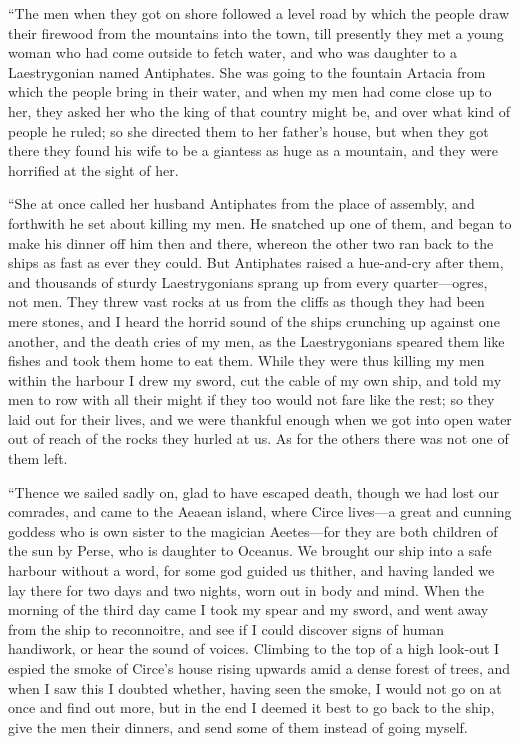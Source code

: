 “The men when they got on shore followed a level road by which the people draw
their firewood from the mountains into the town, till presently they met a
young woman who had come outside to fetch water, and who was daughter to a
Laestrygonian named Antiphates. She was going to the fountain Artacia from
which the people bring in their water, and when my men had come close up to
her, they asked her who the king of that country might be, and over what kind
of people he ruled; so she directed them to her father’s house, but when they
got there they found his wife to be a giantess as huge as a mountain, and they
were horrified at the sight of her.

“She at once called her husband Antiphates from the place of assembly, and
forthwith he set about killing my men. He snatched up one of them, and began to
make his dinner off him then and there, whereon the other two ran back to the
ships as fast as ever they could. But Antiphates raised a hue-and-cry after
them, and thousands of sturdy Laestrygonians sprang up from every
quarter—ogres, not men. They threw vast rocks at us from the cliffs as though
they had been mere stones, and I heard the horrid sound of the ships crunching
up against one another, and the death cries of my men, as the Laestrygonians
speared them like fishes and took them home to eat them. While they were thus
killing my men within the harbour I drew my sword, cut the cable of my own
ship, and told my men to row with all their might if they too would not fare
like the rest; so they laid out for their lives, and we were thankful enough
when we got into open water out of reach of the rocks they hurled at us. As for
the others there was not one of them left.

“Thence we sailed sadly on, glad to have escaped death, though we had lost our
comrades, and came to the Aeaean island, where Circe lives—a great and cunning
goddess who is own sister to the magician Aeetes—for they are both children of
the sun by Perse, who is daughter to Oceanus. We brought our ship into a safe
harbour without a word, for some god guided us thither, and having landed we
lay there for two days and two nights, worn out in body and mind. When the
morning of the third day came I took my spear and my sword, and went away from
the ship to reconnoitre, and see if I could discover signs of human handiwork,
or hear the sound of voices. Climbing to the top of a high look-out I espied
the smoke of Circe’s house rising upwards amid a dense forest of trees, and
when I saw this I doubted whether, having seen the smoke, I would not go on at
once and find out more, but in the end I deemed it best to go back to the ship,
give the men their dinners, and send some of them instead of going myself.

